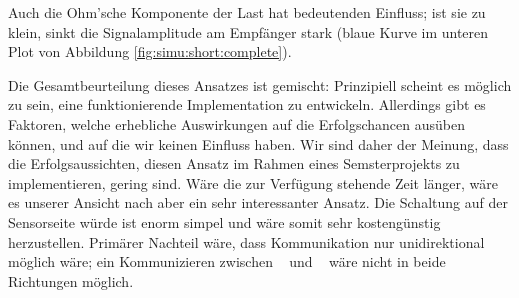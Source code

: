 Auch die  Ohm'sche Komponente der  Last hat  bedeutenden Einfluss; ist  sie zu
klein, sinkt die Signalamplitude am  Empf\"anger stark (blaue Kurve im unteren
Plot von Abbildung \ref{fig:simu:short:complete}).

Die  Gesamtbeurteilung  dieses   Ansatzes  ist  gemischt: Prinzipiell  scheint
es    m\"oglich   zu    sein,   eine    funktionierende   Implementation    zu
entwickeln. Allerdings gibt  es Faktoren,  welche erhebliche  Auswirkungen auf
die  Erfolgschancen  aus\"uben  k\"onnen,  und auf  die  wir  keinen  Einfluss
haben. Wir sind daher  der Meinung, dass die  Erfolgsaussichten, diesen Ansatz
im Rahmen eines Semsterprojekts zu implementieren, gering sind. W\"are die zur
Verf\"ugung stehende  Zeit l\"anger, w\"are  es unserer Ansicht nach  aber ein
sehr  interessanter  Ansatz. Die Schaltung  auf  der  Sensorseite w\"urde  ist
enorm simpel  und w\"are  somit sehr  kosteng\"unstig herzustellen. Prim\"arer
Nachteil w\"are,  dass Kommunikation nur unidirektional  m\"oglich w\"are; ein
Kommunizieren zwischen \Master~ und \Sensor~  w\"are nicht in beide Richtungen
m\"oglich.
